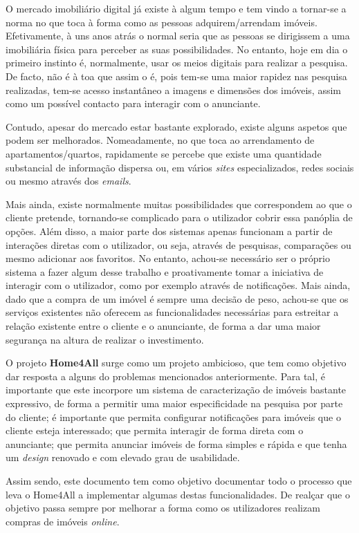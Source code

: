 
O mercado imobiliário digital já existe à algum tempo e tem vindo a tornar-se
a norma no que toca à forma como as pessoas adquirem/arrendam imóveis.
Efetivamente, à uns anos atrás o normal seria que as pessoas se dirigissem a
uma imobiliária física para perceber as suas possibilidades. No entanto, hoje
em dia o primeiro instinto é, normalmente, usar os meios digitais para
realizar a pesquisa. De facto, não é à toa que assim o é, pois tem-se uma
maior rapidez nas pesquisa realizadas, tem-se acesso instantâneo a imagens e
dimensões dos imóveis, assim como um possível contacto para interagir com o
anunciante.

Contudo, apesar do mercado estar bastante explorado, existe alguns aspetos que
podem ser melhorados. Nomeadamente, no que toca ao arrendamento de
apartamentos/quartos, rapidamente se percebe que existe uma quantidade
substancial de informação dispersa ou, em vários \textit{sites} especializados, 
redes sociais ou mesmo através dos \textit{emails}. 

Mais ainda, existe normalmente muitas possibilidades que correspondem ao que o
cliente pretende, tornando-se complicado para o utilizador cobrir essa
panóplia de opções. Além disso, a maior parte dos sistemas apenas funcionam a
partir de interações diretas com o utilizador, ou seja, através de pesquisas,
comparações ou mesmo adicionar aos favoritos. No entanto, achou-se necessário
ser o próprio sistema a fazer algum desse trabalho e proativamente tomar a
iniciativa de interagir com o utilizador, como por exemplo através de
notificações. Mais ainda, dado que a compra de um imóvel é sempre uma decisão
de peso, achou-se que os serviços existentes não oferecem as funcionalidades
necessárias para estreitar a relação existente entre o cliente e o anunciante,
de forma a dar uma maior segurança na altura de realizar o investimento.

O projeto \textbf{Home4All} surge como um projeto ambicioso, que tem como objetivo 
dar resposta a alguns do problemas mencionados anteriormente. Para tal, é
importante que este incorpore um sistema de caracterização de imóveis bastante
expressivo, de forma a permitir uma maior especificidade na pesquisa por parte
do cliente; é importante que permita configurar notificações para imóveis que
o cliente esteja interessado; que permita interagir de forma direta com o
anunciante; que permita anunciar imóveis de forma simples e rápida e que tenha
um \textit{design} renovado e com elevado grau de usabilidade.

Assim sendo, este documento tem como objetivo documentar todo o processo que
leva o Home4All a implementar algumas destas funcionalidades. De realçar que o
objetivo passa sempre por melhorar a forma como os utilizadores realizam compras 
de imóveis \textit{online}.
